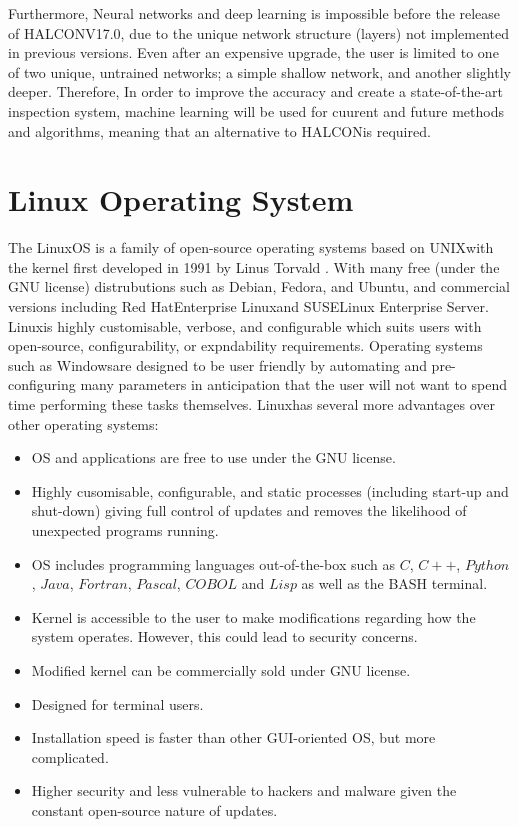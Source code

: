 \documentclass[fleqn,twoside,12pt]{report}
\begin{document}
Furthermore, Neural networks and deep learning is impossible before the release of HALCON\texttrademark V17.0, due to the unique network structure (layers) not implemented in previous versions. Even after an expensive upgrade, the user is limited to one of two unique, untrained networks; a simple shallow network, and another slightly deeper. Therefore, In order to improve the accuracy and create a state-of-the-art inspection system, machine learning will be used for cuurent and future methods and algorithms, meaning that an alternative to HALCON\texttrademark is required.


\section{Linux Operating System}


The Linux\textregistered OS is a family of open-source operating systems based on UNIX\textregistered with the kernel first developed in 1991 by Linus Torvald \cite{wiki_linux}. With many free (under the GNU license) distrubutions such as Debian\textregistered, Fedora\textregistered, and Ubuntu\textregistered, and commercial versions including Red Hat\textregistered Enterprise Linux\textregistered and SUSE\textregistered Linux Enterprise Server\textregistered. Linux\textregistered is highly customisable, verbose, and configurable which suits users with open-source, configurability, or expndability requirements. Operating systems such as Windows\textregistered are designed to be user friendly by automating and pre-configuring many parameters in anticipation that the user will not want to spend time performing these tasks themselves. Linux\textregistered has several more advantages over other operating systems:

\begin{itemize}
	\item OS and applications are free to use under the GNU license.
	\item Highly cusomisable, configurable, and static processes (including start-up and shut-down) giving full control of updates and removes the likelihood of unexpected programs running.
	\item OS includes programming languages out-of-the-box such as $C$, $C++$, $Python$, $Java$, $Fortran$, $Pascal$, $COBOL$ and $Lisp$ as well as the BASH terminal.
	\item Kernel is accessible to the user to make modifications regarding how the system operates. However, this could lead to security concerns.
	\item Modified kernel can be commercially sold under GNU license.
	\item Designed for terminal users.
	\item Installation speed is faster than other GUI-oriented OS, but more complicated.
	\item Higher security and less vulnerable to hackers and malware given the constant open-source nature of updates. 
\end{itemize}
\end{document}
